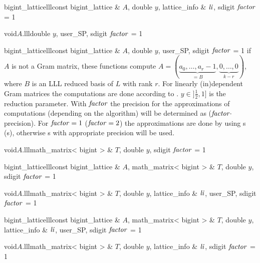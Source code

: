 \begin{fcode}{bigint_lattice}{lll}{const bigint_lattice & $A$, double $y$, lattice_info & $\mathit{li}$,
    sdigit $\mathit{factor}$ = 1}%
\end{fcode}

\begin{fcode}{void}{$A$.lll}{double $y$, user_SP, sdigit $\mathit{factor}$ = 1}
\end{fcode}

\begin{fcode}{bigint_lattice}{lll}{const bigint_lattice & $A$, double $y$, user_SP, sdigit $\mathit{factor}$ = 1}
  if $A$ is not a Gram matrix, these functions compute $A = (\underbrace{a_0, \dots,
    a_r-1}_{=B}, \underbrace{0, \dots, 0}_{k-r})$, where $B$ is an LLL reduced basis of $L$ with
  rank $r$.  For linearly (in)dependent Gram matrices the computations are done according to
  \cite{Cohen:1995}.  $y\in ]\frac{1}{2},1]$ is the reduction parameter.  With $\mathit{factor}$ the
  precision for the approximations of computations (depending on the algorithm) will be
  determined as ($\mathit{factor} \cdot$  precision).  For $\mathit{factor} = 1$ ($\mathit{factor} = 2$)
  the approximations are done by using s (s), otherwise
  s with appropriate precision will be used.
\end{fcode}

\begin{fcode}{void}{$A$.lll}{math_matrix< bigint > & $T$, double $y$, sdigit $\mathit{factor}$ = 1}
\end{fcode}

\begin{fcode}{bigint_lattice}{lll}{const bigint_lattice & $A$, math_matrix< bigint > & $T$,
    double $y$, sdigit $\mathit{factor}$ = 1}%
\end{fcode}

\begin{fcode}{void}{$A$.lll}{math_matrix< bigint > & $T$, double $y$, lattice_info & $\mathit{li}$,
    user_SP, sdigit $\mathit{factor}$ = 1}%
\end{fcode}

\begin{fcode}{bigint_lattice}{lll}{const bigint_lattice & $A$, math_matrix< bigint > & $T$,
    double $y$, lattice_info & $\mathit{li}$, user_SP, sdigit $\mathit{factor}$ = 1}%
\end{fcode}

\begin{fcode}{void}{$A$.lll}{math_matrix< bigint > & $T$, double $y$, lattice_info & $\mathit{li}$,
    sdigit $\mathit{factor}$ = 1}%
\end{fcode}


